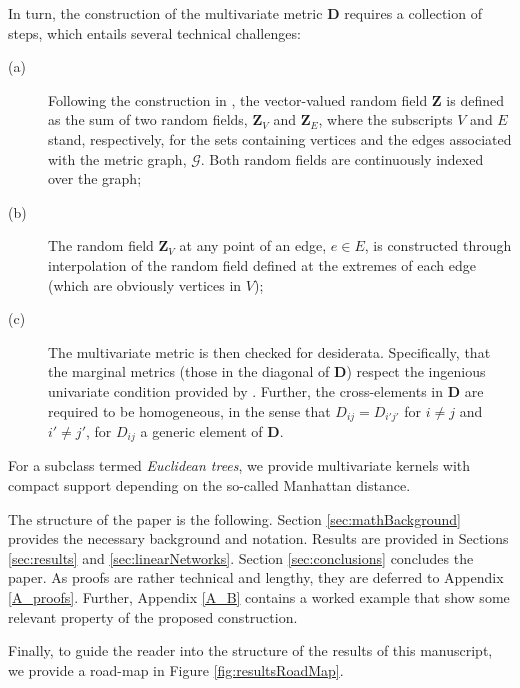 \documentclass[12pt]{article}
\theoremstyle{plain}
\theoremstyle{remark}
\newcommand{\latMatr}[1]{\mathbf{#1}}          %
\begin{document}
    In turn, the construction of the multivariate metric $\latMatr D$ requires a collection of steps, which entails several technical challenges: 
    \begin{description}
        \item[(a)] Following the construction in \cite{anderes_isotropic_2020}, the vector-valued random field $\bm{Z}$ is defined as the sum of two random fields, $\bm{Z}_V$ and $\bm{Z}_E$, where the subscripts $V$ and $E$ stand, respectively, for the sets containing vertices and the edges associated with the metric graph, $\mathcal G$. Both {random fields} are continuously indexed over the graph;
        \item[(b)] The {random field} $\bm{Z}_V$ at any point of an edge, $e \in E$, is constructed through interpolation of the {random field} defined at the extremes of each edge (which are obviously vertices in $V$);
        \item[(c)] The multivariate metric is then checked for desiderata. Specifically, that the marginal metrics (those in the diagonal of $\latMatr{D}$) respect the ingenious univariate condition provided by \cite{anderes_isotropic_2020}. Further, the cross-elements in $\latMatr{D}$ are required to be homogeneous, in the sense that $D_{ij} = D_{i'j'}$ for $i \ne j $ and $i' \ne j'$, for $D_{ij}$ a generic element of $\latMatr{D}$.
    \end{description}
    For a subclass termed {\em Euclidean trees}, we provide multivariate kernels with compact support depending on the so-called Manhattan distance. \par 
    The structure of the paper is the following. Section \ref{sec:mathBackground} provides the necessary background and notation. Results are provided in Sections \ref{sec:results} and \ref{sec:linearNetworks}. Section \ref{sec:conclusions} concludes the paper. As proofs are rather technical and lengthy, they are deferred to Appendix \ref{A_proofs}. Further, Appendix \ref{A_B} contains a worked example that show some relevant property of the proposed construction. \par
    Finally, to guide the reader into the structure of the results of this manuscript, we provide a road-map in Figure \ref{fig:resultsRoadMap}.
\end{document}
